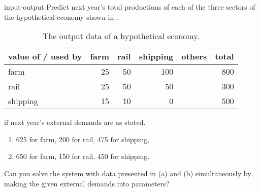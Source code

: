 \begin{exercise}{}{input-output}
 Predict next year's total productions of each of the three sectors of the
 hypothetical economy shown in .
 \begin{table}[H]
  \centering
  \begin{tabular}{l | r | r | r | r | r}
   value of / \textbf{used by} & \textbf{farm} & \textbf{rail} &
   \textbf{shipping} & \textbf{others} & \textbf{total}\\
   \toprule
   farm & 25 & 50 & 100 & & 800\\
   rail & 25 & 50 & 50 & & 300\\
   shipping & 15 & 10 & 0 & & 500
  \end{tabular}
  \caption{The output data of a hypothetical economy.}
  \label{table:hypothetical-economy}
 \end{table}
 if next year's external demands are as stated.
 \begin{enumerate}[label=(\alph*)]
  \item 625 for farm, 200 for rail, 475 for shipping,
  \item 650 for farm, 150 for rail, 450 for shipping.
 \end{enumerate}
 Can you solve the system with data presented in (a) and (b) simultaneously by
 making the given external demands into parameters?
\end{exercise}

